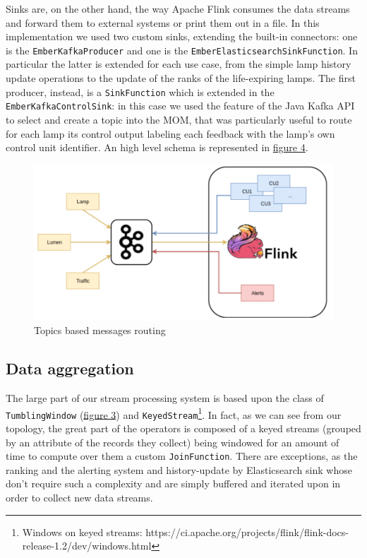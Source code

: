 Sinks are, on the other hand, the way Apache Flink consumes the data streams and forward them to external systems or print them out in a file. In this implementation we used two custom sinks, extending the built-in connectors: one is the \texttt{EmberKafkaProducer} and one is the \texttt{EmberElasticsearchSinkFunction}. In particular the latter is extended for each use case, from the simple lamp history update operations to the update of the ranks of the life-expiring lamps. The first producer, instead, is a \texttt{SinkFunction} which is extended in the \texttt{EmberKafkaControlSink}: in this case we used the feature of the Java Kafka API to select and create a topic into the MOM, that was particularly useful to route for each lamp its control output labeling each feedback with the lamp's own control unit identifier. An high level schema is represented in \hyperref[fig:ember_kafkatopology]{figure 4}.

\begin{figure}[!b]
\begin{center}
	\includegraphics[scale=0.40]{img/ember_kafkatopology}
	\caption{Topics based messages routing}
	\label{fig:ember_kafkatopology}
\end{center}
\end{figure}


\subsection{Data aggregation}
The large part of our stream processing system is based upon the class of \texttt{TumblingWindow} (\hyperref[fig:flink_windows]{figure 3}) and \texttt{KeyedStream}\footnote{Windows on keyed streams: https://ci.apache.org/projects/flink/flink-docs-release-1.2/dev/windows.html}. In fact, as we can see from our topology, the great part of the operators is composed of a keyed streams (grouped by an attribute of the records they collect) being windowed for an amount of time to compute over them a custom \texttt{JoinFunction}. There are exceptions, as the ranking and the alerting system and history-update by Elasticsearch sink whose don't require such a complexity and are simply buffered and iterated upon in order to collect new data streams. 

